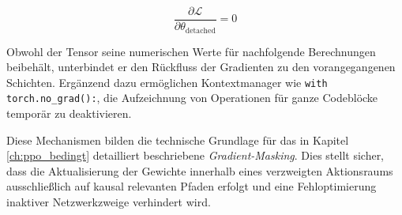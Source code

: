 \begin{equation} \frac{\partial \mathcal{L}}{\partial \theta_{\text{detached}}} = 0 \end{equation}

Obwohl der Tensor seine numerischen Werte für nachfolgende Berechnungen beibehält, unterbindet er 
den Rückfluss der Gradienten zu den vorangegangenen Schichten.
Ergänzend dazu ermöglichen Kontextmanager wie \texttt{with torch.no\_grad():}, die Aufzeichnung von Operationen für ganze Codeblöcke temporär zu deaktivieren.
\medskip

Diese Mechanismen bilden die technische Grundlage für das in Kapitel \ref{ch:ppo_bedingt} detailliert beschriebene \textit{Gradient\hyp{}Masking}. Dies stellt sicher, dass die Aktualisierung der Gewichte innerhalb eines verzweigten
Aktionsraums ausschließlich auf kausal relevanten Pfaden erfolgt und eine Fehloptimierung inaktiver Netzwerkzweige verhindert wird.


